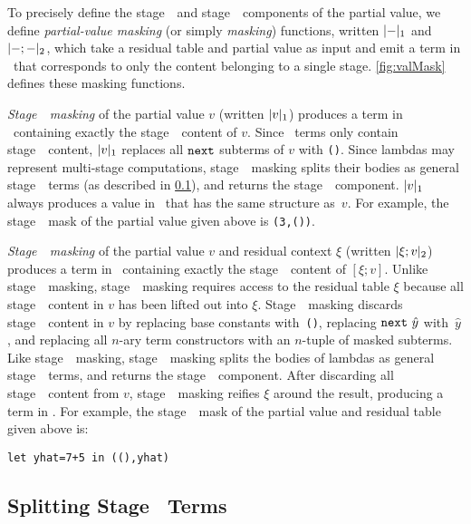 To precisely define the stage~\bbone\ and stage~\bbtwo\ components of the partial value, we define 
\emph{partial-value masking} (or simply {\em masking}) functions, written $|{-}|_{ 1}$ and $|{-};{-}|_{ 2}$, 
which take a residual table and partial value as input and emit a term in \langmono\
that corresponds to only the content belonging to a single stage. \ref{fig:valMask} defines these
masking functions.

\emph{Stage~\bbone\ masking} of the partial value $v$ (written $|v|_{ 1}$) produces a term in \langmono\ containing exactly
the stage~\bbone\ content of $v$. Since \next\ terms only contain stage~\bbtwo\
content, $|v|_{ 1}$ replaces all ${\tt next}$ subterms of $v$ with \texttt{()}.  Since lambdas may represent multi-stage computations, stage~\bbone\ masking splits their bodies as general stage~\bbone\ terms (as described in \ref{sec:split-one}), and returns
the stage~\bbone\ component. $|v|_{ 1}$ always produces a value in \langmono\ that has
the same structure as~$v$.  For example, the stage~\bbone\ mask of the partial value given above is \texttt{(3,())}. 

\emph{Stage~\bbtwo\ masking} of the partial value $v$ and residual context $\xi$ (written $|\xi;v|_{ 2}$) produces a term in \langmono\ containing
exactly the stage~\bbtwo\ content of $[\xi;v]$. Unlike stage~\bbone\ masking, stage~\bbtwo\ masking 
requires access to the residual table $\xi$ because all stage~\bbtwo\
content in $v$ has been lifted out into $\xi$. Stage~\bbtwo\ masking discards
stage~\bbone\ content in $v$ by replacing base constants with~\texttt{()},
replacing ${\tt next}~\hat{y}$ with~$\hat{y}$, and replacing all $n$-ary term
constructors with an $n$-tuple of masked subterms. Like stage~\bbone\ masking, stage~\bbtwo\
masking splits the bodies of lambdas as general stage~\bbone\ terms, and
returns the stage~\bbtwo\ component. After discarding all stage~\bbone\ content from $v$, stage~\bbtwo\ masking reifies $\xi$ around the result,
producing a term in \langmono. For example, the stage~\bbtwo\ mask of the partial value and residual table given above is:
\begin{lstlisting}
let yhat=7+5 in ((),yhat)
\end{lstlisting}

\subsection{Splitting Stage \bbone\ Terms}
\label{sec:split-one}


